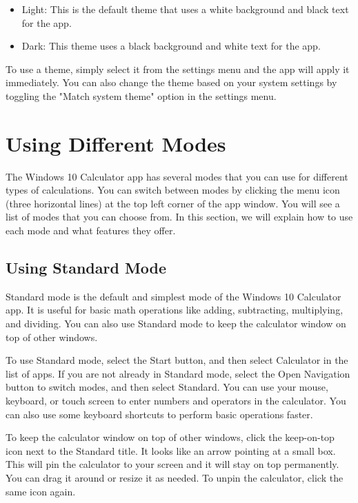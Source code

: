 \documentclass[12pt]{article}
\begin{document}
\begin{itemize}
    \item Light: This is the default theme that uses a white background and black text for the app.
    \item Dark: This theme uses a black background and white text for the app.
\end{itemize}

To use a theme, simply select it from the settings menu and the app will apply it immediately. You can also change the theme based on your system settings by toggling the "Match system theme" option in the settings menu.

\section{Using Different Modes}
The Windows 10 Calculator app has several modes that you can use for different types of calculations. You can switch between modes by clicking the menu icon (three horizontal lines) at the top left corner of the app window. You will see a list of modes that you can choose from. In this section, we will explain how to use each mode and what features they offer.

\subsection{Using Standard Mode}
Standard mode is the default and simplest mode of the Windows 10 Calculator app. It is useful for basic math operations like adding, subtracting, multiplying, and dividing. You can also use Standard mode to keep the calculator window on top of other windows.

To use Standard mode, select the Start button, and then select Calculator in the list of apps. If you are not already in Standard mode, select the Open Navigation button to switch modes, and then select Standard\cite{calculator-app}. You can use your mouse, keyboard, or touch screen to enter numbers and operators in the calculator. You can also use some keyboard shortcuts to perform basic operations faster.

To keep the calculator window on top of other windows, click the keep-on-top icon next to the Standard title. It looks like an arrow pointing at a small box\cite{calculator-top}. This will pin the calculator to your screen and it will stay on top permanently. You can drag it around or resize it as needed. To unpin the calculator, click the same icon again.
\end{document}

